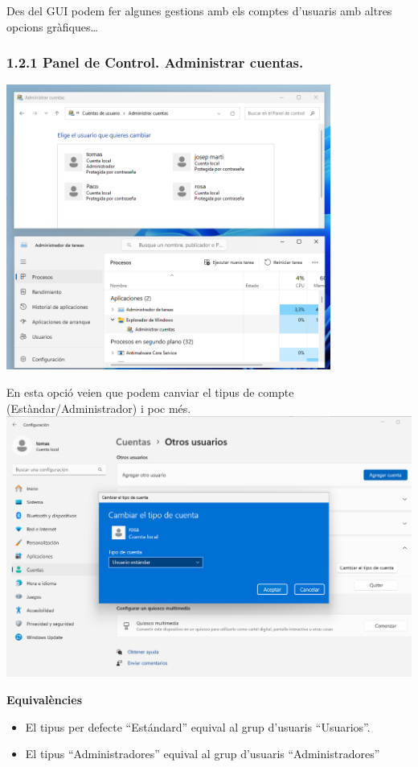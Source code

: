 \documentclass[
  a4paper,
]{article}
\providecommand{\tightlist}{%
  \setlength{\itemsep}{0pt}\setlength{\parskip}{0pt}}
\begin{document}
Des del GUI podem fer algunes gestions amb els comptes d'usuaris amb
altres opcions gràfiques\ldots{}

\subsubsection{1.2.1 Panel de Control. Administrar
cuentas.}\label{panel-de-control.-administrar-cuentas.}

\includegraphics[width=0.8\textwidth,height=\textheight]{png/1PaneldeControlAdministrarCuentas.png}

En esta opció veien que podem canviar el tipus de compte
(Estàndar/Administrador) i poc més.
\includegraphics{png/cambiaTipoCuenta.png}

\textbf{Equivalències}

\begin{itemize}
\tightlist
\item
  El tipus per defecte ``Estándard'' equival al grup d'usuaris
  ``Usuarios''.
\item
  El tipus ``Administradores'' equival al grup d'usuaris
  ``Administradores''
\end{itemize}
\end{document}
